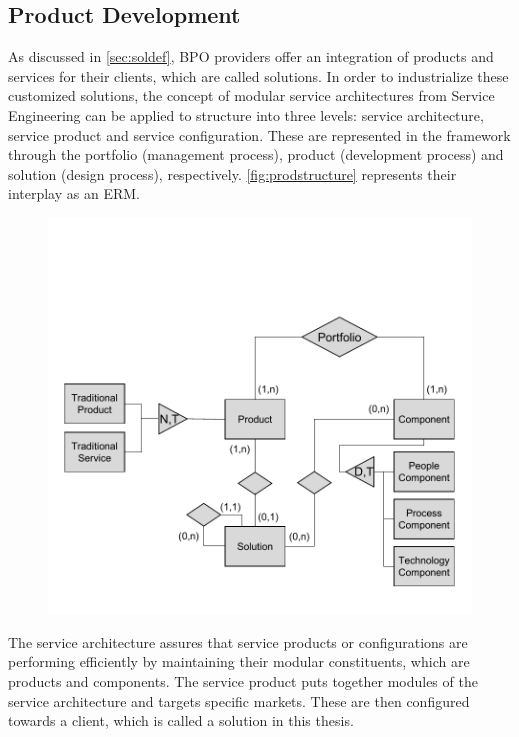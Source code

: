 	\subsection{Product Development}
	\label{sec:proddev}
	
	As discussed in \ref{sec:soldef}, \acrshort{BPO} providers offer an integration of products and services for their clients, which are called solutions. In order to industrialize these customized solutions, the concept of modular service architectures from Service Engineering \citep{Bohmann2006} can be applied to structure into three levels: service architecture, service product and service configuration. These are represented in the framework through the portfolio (management process), product (development process) and solution (design process), respectively. \Fig \ref{fig:prodstructure} represents their interplay as an \acrshort{ERM}. 
	
	\begin{figure}[caption={Solution-Product-Portfolio Structure }, label={fig:prodstructure}]
		{	\includegraphics[width=.8\textwidth]{figures/producterm.pdf}}
		
	\end{figure} 
	
	The service architecture assures that service products or configurations are performing efficiently by maintaining their modular constituents, which are products and components. The service product puts together modules of the service architecture and targets specific markets. These are then configured towards a client, which is called a solution in this thesis. 
	
